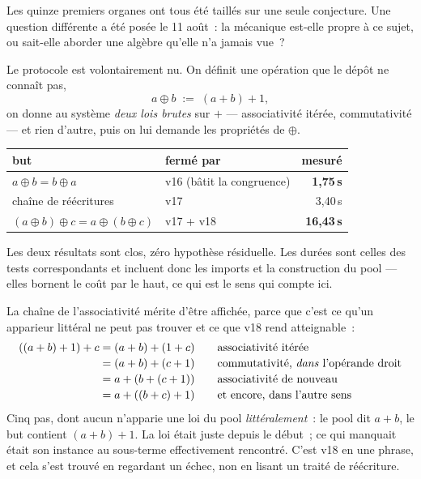 \documentclass[11pt]{article}
\theoremstyle{remark}\newtheorem{remarque}{Remarque}
\begin{document}
Les quinze premiers organes ont tous été taillés sur une seule conjecture. Une question
différente a été posée le 11 août~: la mécanique est-elle propre à ce sujet, ou sait-elle
aborder une algèbre qu'elle n'a jamais vue~?

Le protocole est volontairement nu. On définit une opération que le dépôt ne connaît pas,
\[ a \oplus b \;:=\; (a + b) + 1 , \]
on donne au système \emph{deux lois brutes} sur $+$ --- associativité itérée,
commutativité --- et rien d'autre, puis on lui demande les propriétés de $\oplus$.

\begin{center}\small
\begin{tabular}{@{}llr@{}}
\toprule
but & fermé par & mesuré \\
\midrule
$a \oplus b = b \oplus a$ & v16 (bâtit la congruence) & \textbf{1,75\,s} \\
chaîne de réécritures & v17 & 3,40\,s \\
$(a \oplus b) \oplus c = a \oplus (b \oplus c)$ & v17 + v18 & \textbf{16,43\,s} \\
\bottomrule
\end{tabular}
\end{center}

Les deux résultats sont clos, zéro hypothèse résiduelle. Les durées sont celles des tests
correspondants et incluent donc les imports et la construction du pool --- elles bornent
le coût par le haut, ce qui est le sens qui compte ici.

La chaîne de l'associativité mérite d'être affichée, parce que c'est ce qu'un
apparieur littéral ne peut pas trouver et ce que v18 rend atteignable~:
\[
\begin{array}{r@{\;}c@{\;}l@{\qquad}l}
((a+b)+1)+c &=& (a+b)+(1+c) & \text{associativité itérée} \\[2pt]
            &=& (a+b)+(c+1) & \text{commutativité, \emph{dans} l'opérande droit} \\[2pt]
            &=& a+(b+(c+1)) & \text{associativité de nouveau} \\[2pt]
            &=& a+((b+c)+1) & \text{et encore, dans l'autre sens}
\end{array}
\]
Cinq pas, dont aucun n'apparie une loi du pool \emph{littéralement}~: le pool dit $a+b$,
le but contient $(a+b)+1$. La loi était juste depuis le début~; ce qui manquait était son
instance au sous-terme effectivement rencontré. C'est v18 en une phrase, et cela s'est
trouvé en regardant un échec, non en lisant un traité de réécriture.
\end{document}
